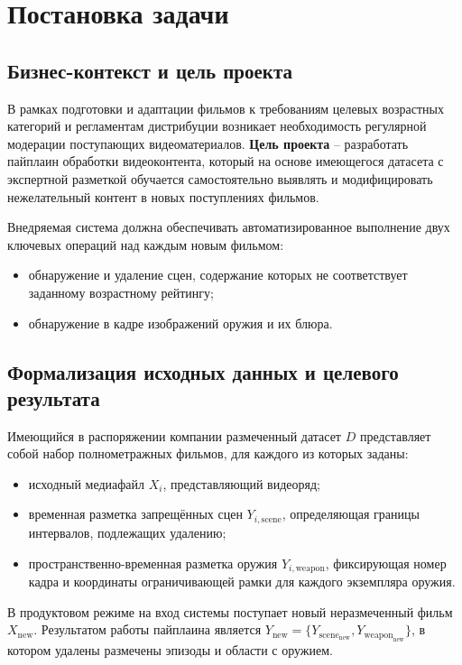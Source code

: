 \documentclass[a4paper,14pt]{extarticle}
\begin{document}
    \tableofcontents
    \thispagestyle{empty}

    \newpage
    \section{Постановка задачи}
    \subsection{Бизнес-контекст и цель проекта}
    В рамках подготовки и адаптации фильмов к требованиям целевых возрастных категорий и регламентам дистрибуции возникает необходимость регулярной модерации поступающих видеоматериалов.
    \textbf{Цель проекта} -- разработать пайплаин обработки видеоконтента, который на основе имеющегося датасета с экспертной разметкой обучается самостоятельно выявлять и модифицировать нежелательный контент в новых поступлениях фильмов.

    Внедряемая система должна обеспечивать автоматизированное выполнение двух ключевых операций над каждым новым фильмом:
    \begin{itemize}
        \item обнаружение и удаление сцен, содержание которых не соответствует заданному возрастному рейтингу;
        \item обнаружение в кадре изображений оружия и их блюра.
    \end{itemize}

    \subsection{Формализация исходных данных и целевого результата}
    Имеющийся в распоряжении компании размеченный датасет $D$ представляет собой набор полнометражных фильмов, для каждого из которых заданы:
    \begin{itemize}
        \item исходный медиафайл $X_i$, представляющий видеоряд;
        \item временная разметка запрещённых сцен $Y_{i,\text{scene}}$, определяющая границы интервалов, подлежащих удалению;
        \item пространственно-временная разметка оружия $Y_{i,\text{weapon}}$, фиксирующая номер кадра и координаты ограничивающей рамки для каждого экземпляра оружия.
    \end{itemize}

    В продуктовом режиме на вход системы поступает новый неразмеченный фильм $X_{\text{new}}$. 
    Результатом работы пайплаина является $Y_{\text{new}} = \{ Y_{\text{scene}_{\text{new}}}, Y_{\text{weapon}_{\text{new}}} \}$, в котором удалены размечены эпизоды и области с оружием.
\end{document}
